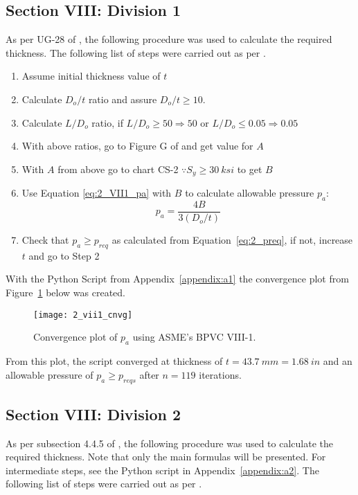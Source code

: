 \subsection{Section VIII: Division 1}
As per UG-28 of \cite{ASMEbvpcVII1}, the following procedure was used to calculate the required thickness.
The following list of steps were carried out as per \cite{ASMEbvpcVII1}.

\begin{enumerate}
	\item Assume initial thickness value of $t$
	\item Calculate $D_o/t$ ratio and assure $D_o/t \geq 10$.
	\item Calculate $L/D_o$ ratio, if $L/D_o \geq 50 \Rightarrow 50$ or  $L/D_o \leq 0.05 \Rightarrow 0.05$
	\item With above ratios, go to Figure G of \cite{ASMEbvpcIID} and get value for $A$
	\item With $A$ from above go to chart CS-2 $\because S_y \geq 30 \ ksi$ to get $B$
	\item Use Equation \ref{eq:2_VII1_pa} with $B$ to calculate allowable pressure $p_a$:
		\begin{equation}
			\label{eq:2_VII1_pa}
			p_a = \frac{4B}{3 \left(D_o/t\right)}
		\end{equation}
	\item Check that $p_a \geq p_{req}$ as calculated from Equation~\ref{eq:2_preq}, if not, increase $t$ and go to Step 2\\
	
\end{enumerate}

With the Python Script from Appendix~\ref{appendix:a1} the convergence plot from Figure~\ref{fig:2_vii1_cnvg} below was created.
\begin{figure}[H]
    \centering
    \texttt{[image: 2\_vii1\_cnvg]}
    \caption{Convergence plot of $p_a$ using ASME's BPVC VIII-1.}
    \label{fig:2_vii1_cnvg}
\end{figure}

From this plot, the script converged at thickness of $t = 43.7\ mm = 1.68\ in$ and an allowable pressure of $p_a\geq p_{reqs}$ after $n=119$ iterations. 


\subsection{Section VIII: Division 2}
As per subsection 4.4.5 of \cite{ASMEbvpcVII2}, the following procedure was used to calculate the required thickness. Note that only the main formulas will be presented. For intermediate steps, see  the Python script in Appendix~\ref{appendix:a2}. The following list of steps were carried out as per \cite{ASMEbvpcVII2}.

